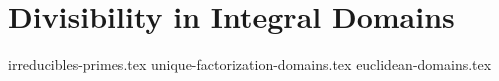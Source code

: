 \chapter{Divisibility in Integral Domains}
{irreducibles-primes.tex}
{unique-factorization-domains.tex}
{euclidean-domains.tex}
